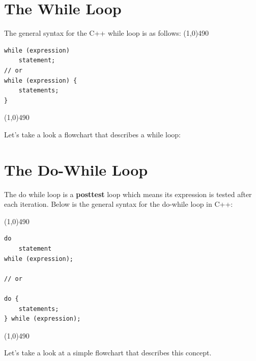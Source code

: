 \documentclass{report}
\begin{document}
    \section{\LARGE The While Loop}
    \bigbreak \noindent 
    The general syntax for the C++ while loop is as follows:
    \bigbreak \noindent 
    \line(1,0){490}
    \begin{verbatim}
while (expression)
    statement;
// or
while (expression) {
    statements;
}
    \end{verbatim}
    \line(1,0){490}
    \bigbreak \noindent 
    \begin{minipage}[]{0.47\textwidth}
        Let's take a look a flowchart that describes a while loop:
    \end{minipage}
    \begin{minipage}[]{0.47\textwidth}
    \end{minipage}
    \bigbreak \noindent 

    \pagebreak \bigbreak \noindent 
    \section{\LARGE The Do-While Loop}
    \bigbreak \noindent 
    \begin{concept}
 The do while loop is a \textbf{posttest} loop which means its expression is tested after each iteration. Below is the general syntax for the do-while loop in C++:
	\end{concept}
    \bigbreak \noindent 
    \line(1,0){490}
    \begin{verbatim}
do 
    statement
while (expression);

// or 

do {
    statements;
} while (expression);
    \end{verbatim}
    \line(1,0){490}
    \bigbreak \noindent 
    \begin{minipage}[]{0.47\textwidth}
        Let's take a look at a simple flowchart that describes this concept.
    
    \end{minipage}
    \begin{minipage}[]{0.47\textwidth}
    \end{minipage}

    \pagebreak \bigbreak \noindent 
\end{document}
